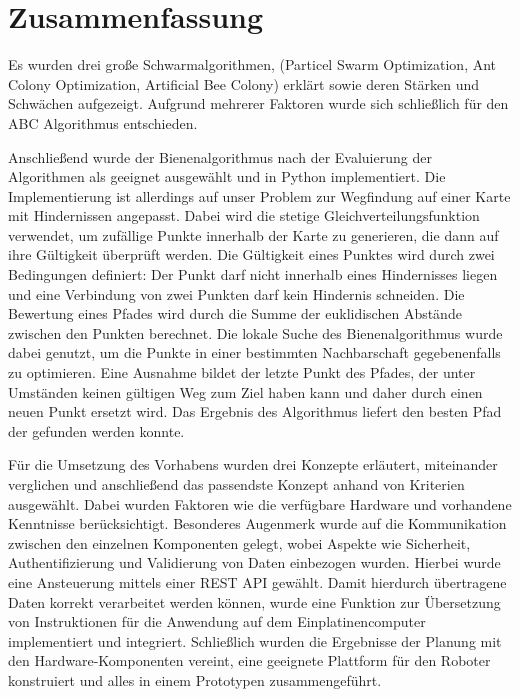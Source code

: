 \section{Zusammenfassung}

Es wurden drei große Schwarmalgorithmen, (Particel Swarm Optimization, Ant Colony Optimization, Artificial Bee Colony) erklärt sowie deren Stärken und Schwächen aufgezeigt. Aufgrund mehrerer Faktoren wurde sich schließlich für den ABC Algorithmus entschieden. 

Anschließend wurde der Bienenalgorithmus nach der Evaluierung der Algorithmen als geeignet ausgewählt und in Python implementiert. 
Die Implementierung ist allerdings auf unser Problem zur Wegfindung auf einer Karte mit Hindernissen angepasst. Dabei wird die stetige Gleichverteilungsfunktion verwendet, um zufällige Punkte innerhalb der Karte zu generieren, die dann auf ihre Gültigkeit überprüft werden. Die Gültigkeit eines Punktes wird durch zwei Bedingungen definiert: Der Punkt darf nicht innerhalb eines Hindernisses liegen und eine Verbindung von zwei Punkten darf kein Hindernis schneiden. Die Bewertung eines Pfades wird durch die Summe der euklidischen Abstände zwischen den Punkten berechnet. Die lokale Suche des Bienenalgorithmus wurde dabei genutzt, um die Punkte in einer bestimmten Nachbarschaft gegebenenfalls zu optimieren. Eine Ausnahme bildet der letzte Punkt des Pfades, der unter Umständen keinen gültigen Weg zum Ziel haben kann und daher durch einen neuen Punkt ersetzt wird. Das Ergebnis des Algorithmus liefert den besten Pfad der gefunden werden konnte. 

Für die Umsetzung des Vorhabens wurden drei Konzepte erläutert, miteinander verglichen und anschließend das passendste Konzept anhand von Kriterien ausgewählt. Dabei wurden Faktoren wie die verfügbare Hardware und vorhandene Kenntnisse berücksichtigt. Besonderes Augenmerk wurde auf die Kommunikation zwischen den einzelnen Komponenten gelegt, wobei Aspekte wie Sicherheit, Authentifizierung und Validierung von Daten einbezogen wurden. Hierbei wurde eine Ansteuerung mittels einer REST API gewählt. Damit hierdurch übertragene Daten korrekt verarbeitet werden können, wurde eine Funktion zur Übersetzung von Instruktionen für die Anwendung auf dem Einplatinencomputer implementiert und integriert. Schließlich wurden die Ergebnisse der Planung mit den Hardware-Komponenten vereint, eine geeignete Plattform für den Roboter konstruiert und alles in einem Prototypen zusammengeführt.

